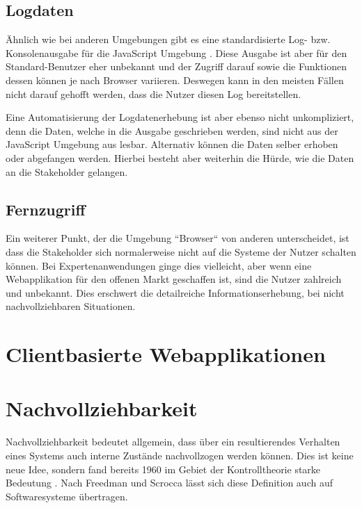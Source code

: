 \subsection{Logdaten}

Ähnlich wie bei anderen Umgebungen gibt es eine standardisierte Log- bzw. Konsolenausgabe für die JavaScript Umgebung \cite{MDNConsole}. Diese Ausgabe ist aber für den Standard-Benutzer eher unbekannt und der Zugriff darauf sowie die Funktionen dessen können je nach Browser variieren. Deswegen kann in den meisten Fällen nicht darauf gehofft werden, dass die Nutzer diesen Log bereitstellen.

Eine Automatisierung der Logdatenerhebung ist aber ebenso nicht unkompliziert, denn die Daten, welche in die Ausgabe geschrieben werden, sind nicht aus der JavaScript Umgebung aus lesbar. Alternativ können die Daten selber erhoben oder abgefangen werden. Hierbei besteht aber weiterhin die Hürde, wie die Daten an die Stakeholder gelangen.

\subsection{Fernzugriff}

Ein weiterer Punkt, der die Umgebung ``Browser`` von anderen unterscheidet, ist dass die Stakeholder sich normalerweise nicht auf die Systeme der Nutzer schalten können. Bei Expertenanwendungen ginge dies vielleicht, aber wenn eine Webapplikation für den offenen Markt geschaffen ist, sind die Nutzer zahlreich und unbekannt. Dies erschwert die detailreiche Informationserhebung, bei nicht nachvollziehbaren Situationen.

\section{Clientbasierte Webapplikationen}

	
\newpage



\newpage

\section{Nachvollziehbarkeit}

	Nachvollziehbarkeit bedeutet allgemein, dass über ein resultierendes Verhalten eines Systems auch interne Zustände nachvollzogen werden können. Dies ist keine neue Idee, sondern fand bereits 1960 im Gebiet der Kontrolltheorie starke Bedeutung \cite{OnTheGeneralTheoryOfControlSystems}. Nach Freedman \cite{TestabilityOfSoftwareComponents} und Scrocca \etal \cite{EnablingEventDrivenObservability} lässt sich diese Definition auch auf Softwaresysteme übertragen.
	

